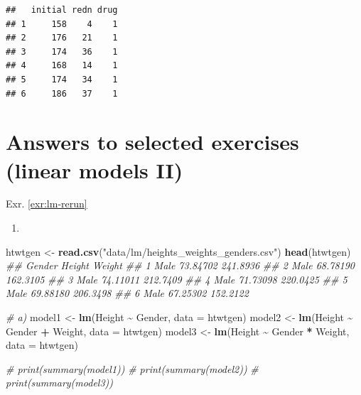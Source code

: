 \documentclass[
]{book}
\newenvironment{Shaded}{\begin{snugshade}}{\end{snugshade}}
\newcommand{\CommentTok}[1]{\textcolor[rgb]{0.56,0.35,0.01}{\textit{#1}}}
\newcommand{\DataTypeTok}[1]{\textcolor[rgb]{0.13,0.29,0.53}{#1}}
\newcommand{\KeywordTok}[1]{\textcolor[rgb]{0.13,0.29,0.53}{\textbf{#1}}}
\newcommand{\NormalTok}[1]{#1}
\newcommand{\OperatorTok}[1]{\textcolor[rgb]{0.81,0.36,0.00}{\textbf{#1}}}
\newcommand{\StringTok}[1]{\textcolor[rgb]{0.31,0.60,0.02}{#1}}
\providecommand{\tightlist}{%
  \setlength{\itemsep}{0pt}\setlength{\parskip}{0pt}}
\theoremstyle{definition}
\theoremstyle{definition}
\theoremstyle{definition}
\theoremstyle{remark}
\begin{document}
\begin{verbatim}
##   initial redn drug
## 1     158    4    1
## 2     176   21    1
## 3     174   36    1
## 4     168   14    1
## 5     174   34    1
## 6     186   37    1
\end{verbatim}

\hypertarget{answers-to-selected-exercises-linear-models-ii}{%
\section*{Answers to selected exercises (linear models II)}\label{answers-to-selected-exercises-linear-models-ii}}

Exr. \ref{exr:lm-rerun}

\begin{enumerate}
\def\labelenumi{\alph{enumi})}
\tightlist
\item
\end{enumerate}

\begin{Shaded}
\begin{Highlighting}[]
\NormalTok{htwtgen \textless{}{-}}\StringTok{ }\KeywordTok{read.csv}\NormalTok{(}\StringTok{"data/lm/heights\_weights\_genders.csv"}\NormalTok{)}
\KeywordTok{head}\NormalTok{(htwtgen)}
\CommentTok{\#\#   Gender   Height   Weight}
\CommentTok{\#\# 1   Male 73.84702 241.8936}
\CommentTok{\#\# 2   Male 68.78190 162.3105}
\CommentTok{\#\# 3   Male 74.11011 212.7409}
\CommentTok{\#\# 4   Male 71.73098 220.0425}
\CommentTok{\#\# 5   Male 69.88180 206.3498}
\CommentTok{\#\# 6   Male 67.25302 152.2122}

\CommentTok{\# a)}
\NormalTok{model1 \textless{}{-}}\StringTok{ }\KeywordTok{lm}\NormalTok{(Height }\OperatorTok{\textasciitilde{}}\StringTok{ }\NormalTok{Gender, }\DataTypeTok{data =}\NormalTok{ htwtgen)}
\NormalTok{model2 \textless{}{-}}\StringTok{ }\KeywordTok{lm}\NormalTok{(Height }\OperatorTok{\textasciitilde{}}\StringTok{ }\NormalTok{Gender }\OperatorTok{+}\StringTok{ }\NormalTok{Weight, }\DataTypeTok{data =}\NormalTok{ htwtgen)}
\NormalTok{model3 \textless{}{-}}\StringTok{ }\KeywordTok{lm}\NormalTok{(Height }\OperatorTok{\textasciitilde{}}\StringTok{ }\NormalTok{Gender }\OperatorTok{*}\StringTok{ }\NormalTok{Weight, }\DataTypeTok{data =}\NormalTok{ htwtgen)}

\CommentTok{\# print(summary(model1))}
\CommentTok{\# print(summary(model2))}
\CommentTok{\# print(summary(model3))}
\end{Highlighting}
\end{Shaded}
\end{document}
